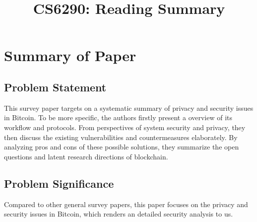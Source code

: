 \documentclass[conference]{IEEEtran}
\begin{document}
\title{CS6290: Reading Summary }

\author{
}

\maketitle

\section{Summary of Paper \cite{conti2018survey}}


\subsection{Problem Statement}
This survey paper targets on a systematic summary of privacy and security issues in Bitcoin.
%
To be more specific, the authors firstly present a overview of its workflow and protocols. 
%
From perspectives of system security and privacy, they then discuss the existing vulnerabilities and countermeasures elaborately.
%
By analyzing pros and cons of these possible solutions, they summarize the open questions and latent research directions of blockchain.

\subsection{Problem Significance}
Compared to other general survey papers, this paper focuses on the privacy and security issues in Bitcoin, which renders an detailed security analysis to us. 
\end{document}
